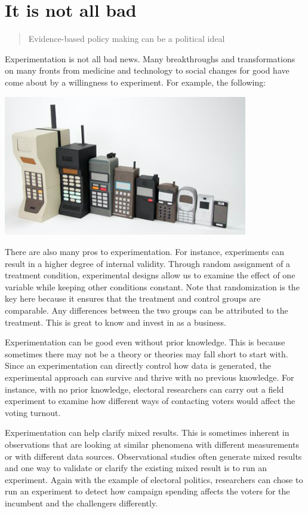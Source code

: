 \documentclass[]{book}
\begin{document}
\hypertarget{it-is-not-all-bad}{%
\section{It is not all bad}\label{it-is-not-all-bad}}

\begin{quote}
Evidence-based policy making can be a political ideal
\end{quote}

Experimentation is not all bad news. Many breakthroughs and transformations on many fronts from medicine and technology to social changes for good have come about by a willingness to experiment. For example, the following:

\includegraphics[width=0.8\textwidth,height=\textheight]{fig/cellphone_evolution.png}

There are also many pros to experimentation. For instance, experiments can result in a higher degree of internal validity. Through random assignment of a treatment condition, experimental designs allow us to examine the effect of one variable while keeping other conditions constant. Note that randomization is the key here because it ensures that the treatment and control groups are comparable. Any differences between the two groups can be attributed to the treatment. This is great to know and invest in as a business.

Experimentation can be good even without prior knowledge. This is because sometimes there may not be a theory or theories may fall short to start with. Since an experimentation can directly control how data is generated, the experimental approach can survive and thrive with no previous knowledge. For instance, with no prior knowledge, electoral researchers can carry out a field experiment to examine how different ways of contacting voters would affect the voting turnout.

Experimentation can help clarify mixed results. This is sometimes inherent in observations that are looking at similar phenomena with different measurements or with different data sources. Observational studies often generate mixed results and one way to validate or clarify the existing mixed result is to run an experiment. Again with the example of electoral politics, researchers can chose to run an experiment to detect how campaign spending affects the voters for the incumbent and the challengers differently.
\end{document}
